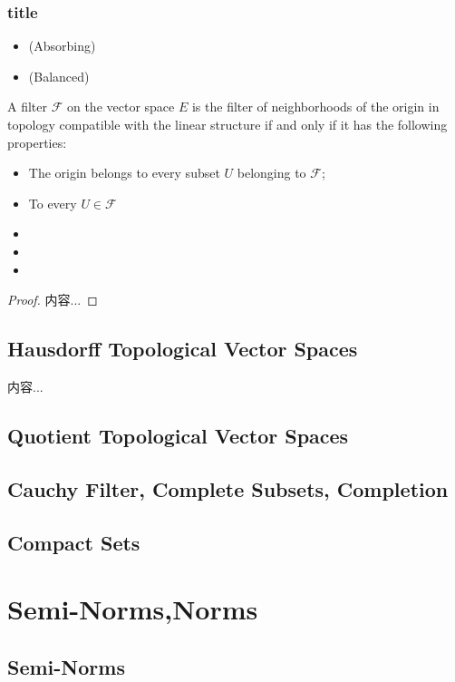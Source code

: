 \documentclass[Total.tex]{subfiles}
\begin{document}
		\subsection{title}
		\begin{Def}
			\begin{itemize}
				\item (Absorbing)
				\item (Balanced)
			\end{itemize}
		\end{Def}
		\begin{theorem}
			A filter $\mathcal{F}$ on the vector space $E$ is the filter of neighborhoods of the origin in topology compatible with the linear structure if and only if it has the following properties:
			\begin{itemize}
				\item The origin belongs to every subset $U$ belonging to $\mathcal{F}$;
				\item To every $U\in \mathcal{F}$
				\item 
				\item 
				\item 
			\end{itemize}
		\end{theorem}
		\begin{proof}
			内容...
		\end{proof}
		\section{Hausdorff Topological Vector Spaces}
		\begin{Def}
			内容...
		\end{Def}
		\section{Quotient Topological Vector Spaces}
		\section{Cauchy Filter, Complete Subsets, Completion}
		\section{Compact Sets}
	\chapter{Semi-Norms,Norms}
		\section{Semi-Norms}
\end{document}
